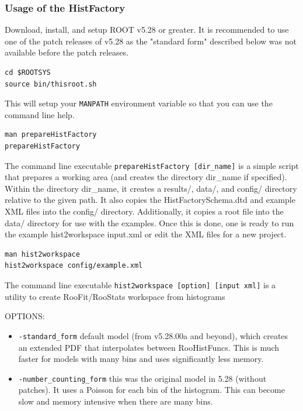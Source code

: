 \clearpage
\subsubsection{Usage of the HistFactory}


Download, install, and setup ROOT v5.28 or greater.  It is recommended to use one of the patch releases of v5.28 as the "standard form" described below was not available before the patch releases.
\begin{verbatim}
cd $ROOTSYS
source bin/thisroot.sh
\end{verbatim}
This will setup your \texttt{MANPATH} environment variable so that you can use the command line help.  


\begin{verbatim}
man prepareHistFactory
prepareHistFactory 
\end{verbatim}

       The command line executable \texttt{prepareHistFactory [dir\_name]}  is  a simple script that prepares a working area (and creates the directory
       dir\_name if specified).  Within the directory dir\_name, it creates a results/, data/, and  config/  directory relative to the given path.  It also copies the HistFactorySchema.dtd and example XML files into the config/ directory.  Additionally, it copies a root file into  the  data/
       directory  for  use  with  the  examples.   Once  this is done, one is ready to run the example
       hist2workspace input.xml or edit the XML files for a new project.



\begin{verbatim}
man hist2workspace
hist2workspace config/example.xml
\end{verbatim}

       The command line executable \texttt{hist2workspace [option] [input xml]} is a utility to create RooFit/RooStats workspace from histograms

OPTIONS:
\begin{itemize}
      \item \texttt{-standard\_form}  default model (from v5.28.00a and beyond), which creates an extended PDF that interpolates between RooHistFuncs.  This is much faster for models with many bins and uses significantly less memory.
       \item \texttt{-number\_counting\_form} this was the original model in 5.28 (without patches). It uses a  Poisson
       for  each  bin of the histogram.  This can become slow and memory intensive when there are many
       bins.
\end{itemize}


